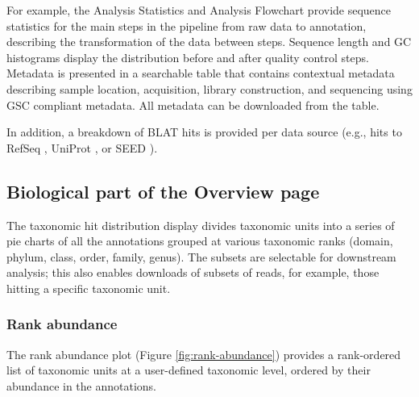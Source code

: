 \documentclass[12pt,fullpage]{report}
\begin{document}
\noindent For example, the Analysis Statistics and Analysis Flowchart provide sequence statistics for the main steps in the pipeline from raw data to annotation, describing the transformation of the data between steps.
Sequence length and GC histograms display the distribution before and after quality control steps.
Metadata is presented in a searchable table that contains contextual metadata describing sample location, acquisition, library construction, and sequencing using GSC compliant metadata. All metadata can be downloaded from the table.

In addition, 
a breakdown of BLAT hits is provided  per data source (e.g., hits to RefSeq \cite{REFSEQ}, UniProt \cite{UNIPROT}, or \gls{SEED} \cite{SUBSYSTEMS}).
\subsection{Biological part of the Overview page }

The taxonomic hit distribution display divides taxonomic units into a series of pie charts of all the annotations grouped at various taxonomic ranks (domain, phylum, class, order, family, genus). The subsets are selectable for downstream analysis; this also enables downloads of subsets of reads, for example, those hitting a specific taxonomic unit.
\subsubsection{Rank abundance}

The rank abundance plot (Figure \ref{fig:rank-abundance}) provides a rank-ordered list of taxonomic units at a user-defined taxonomic level, ordered by their abundance in the annotations.
\end{document}
